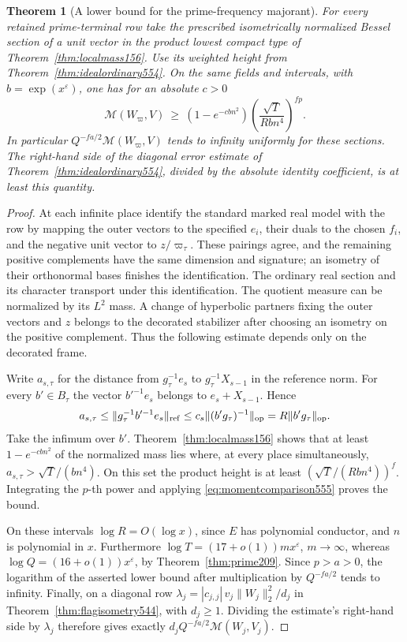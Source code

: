 \documentclass[a4paper,11pt]{article}
\newtheorem{theorem}[proposition]{Theorem}
\theoremstyle{definition}
\theoremstyle{remark}
\numberwithin{equation}{section}
\begin{document}
\begin{theorem}[A lower bound for the prime-frequency majorant]
\leavevmode\label{thm:primemoment555}
For every retained prime-terminal row take the prescribed
isometrically normalized Bessel section of a unit vector in
the product lowest compact type of Theorem~\ref{thm:localmass156}.
Use its weighted height from Theorem~\ref{thm:idealordinary554}.
On the same fields and intervals, with \(b=\exp(x^\varepsilon)\),
one has for an absolute \(c>0\)
\[
      \mathcal M(W_\varpi,V)
        \ \ge\ (1-e^{-c b n^2})
                    \left(\frac{\sqrt T}{R b n^4}\right)^{fp}.
\]
In particular \(Q^{-fa/2}\mathcal M(W_\varpi,V)\) tends to
infinity uniformly for these sections. The right-hand side
of the diagonal error estimate of Theorem~\ref{thm:idealordinary554},
divided by the absolute identity coefficient, is at least this
quantity.
\end{theorem}
\begin{proof}
At each infinite place identify the standard marked real model
with the row by mapping the outer vectors to the specified \(e_i\),
their duals to the chosen \(f_i\), and the negative unit vector
to \(z/\varpi_\tau\). These pairings agree, and the remaining
positive complements have the same dimension and signature;
an isometry of their orthonormal bases finishes the identification.
The ordinary real section and its character transport under
this identification. The quotient measure can be normalized
by its \(L^2\) mass. A change of hyperbolic partners fixing the
outer vectors and \(z\) belongs to the decorated stabilizer
after choosing an isometry on the positive complement. Thus
the following estimate depends only on the decorated frame.

Write \(a_{s,\tau}\) for the distance from \(g_\tau^{-1}e_s\)
to \(g_\tau^{-1}X_{s-1}\) in the reference norm. For every
\(b'\in B_\tau\) the vector \(b'^{-1}e_s\) belongs to
\(e_s+X_{s-1}\). Hence
\[
     a_{s,\tau}
      \le \|g_\tau^{-1}b'^{-1}e_s\|_{\rm ref}
      \le c_s\|(b'g_\tau)^{-1}\|_{\rm op}
      =R\|b'g_\tau\|_{\rm op}.
\]
Take the infimum over \(b'\). Theorem~\ref{thm:localmass156}
shows that at least \(1-e^{-c b n^2}\) of the normalized mass
lies where, at every place simultaneously,
\(a_{s,\tau}>\sqrt T/(bn^4)\). On this set the product height
is at least \((\sqrt T/(Rbn^4))^f\). Integrating the \(p\)-th
power and applying \eqref{eq:momentcomparison555} proves the bound.

On these intervals \(\log R=O(\log x)\), since \(E\) has
polynomial conductor, and \(n\) is polynomial in \(x\).
Furthermore \(\log T=(17+o(1))m x^\varepsilon\), \(m\to\infty\),
whereas \(\log Q=(16+o(1))x^\varepsilon\), by
Theorem~\ref{thm:prime209}. Since \(p>a>0\), the logarithm of
the asserted lower bound after multiplication by \(Q^{-fa/2}\)
tends to infinity. Finally, on a diagonal row
\(\lambda_j=|c_{j,j}|\,v_j\|W_j\|_2^2/d_j\) in
Theorem~\ref{thm:flagisometry544}, with \(d_j\ge1\).
Dividing the estimate's right-hand side by \(\lambda_j\)
therefore gives exactly \(d_jQ^{-fa/2}\mathcal M(W_j,V_j)\).
\end{proof}
\end{document}
